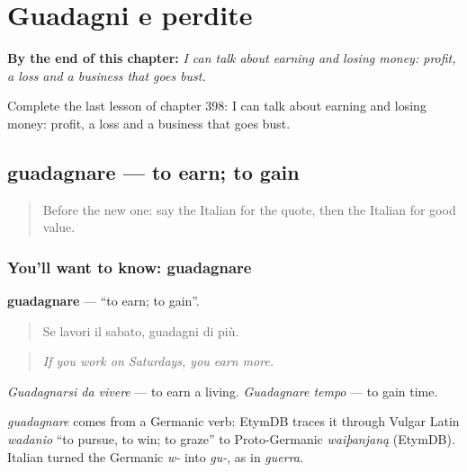 
\chapter{Guadagni e perdite}
\label{ch:it-guadagni-e-perdite}

\begin{chapteropening}
\textbf{By the end of this chapter:} \emph{I can talk about earning and losing money: profit, a loss and a business that goes bust.}

Complete the last lesson of chapter 398: I can talk about earning and losing money: profit, a loss and a business that goes bust.
\end{chapteropening}

\section[guadagnare]{guadagnare — to earn; to gain}

\label{lesson:IT-C398-guadagnare}



\begin{quote}
Before the new one: say the Italian for the quote, then the Italian for good value.
\end{quote}

\subsection*{You'll want to know: guadagnare}
\textbf{guadagnare} — \textquotedblleft{}to earn; to gain\textquotedblright{}.

\begin{quote}
Se lavori il sabato, guadagni di più.
\end{quote}

\begin{quote}
\emph{If you work on Saturdays, you earn more.}
\end{quote}

\emph{Guadagnarsi da vivere} — to earn a living. \emph{Guadagnare tempo} — to gain time.

\begin{cousinweb}
\emph{guadagnare} comes from a Germanic verb: EtymDB traces it through Vulgar Latin \emph{wadanio} \textquotedblleft{}to pursue, to win; to graze\textquotedblright{} to Proto-Germanic \emph{waiþanjaną} (EtymDB). Italian turned the Germanic \emph{w-} into \emph{gu-}, as in \emph{guerra}.
\end{cousinweb}

